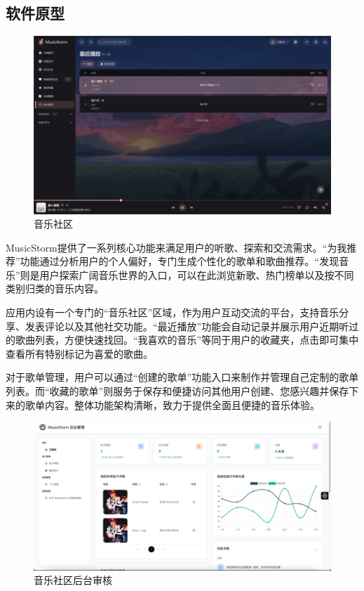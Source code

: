 \documentclass{base}
\begin{document}
\subsection{软件原型}

\begin{figure}[H]
    \centering
    \includegraphics[width=\textwidth]{images/4-4-origin.png}
    \caption{音乐社区}
\end{figure}

MusicStorm提供了一系列核心功能来满足用户的听歌、探索和交流需求。“为我推荐”功能通过分析用户的个人偏好，专门生成个性化的歌单和歌曲推荐。“发现音乐”则是用户探索广阔音乐世界的入口，可以在此浏览新歌、热门榜单以及按不同类别归类的音乐内容。

应用内设有一个专门的“音乐社区”区域，作为用户互动交流的平台，支持音乐分享、发表评论以及其他社交功能。“最近播放”功能会自动记录并展示用户近期听过的歌曲列表，方便快速找回。“我喜欢的音乐”等同于用户的收藏夹，点击即可集中查看所有特别标记为喜爱的歌曲。

对于歌单管理，用户可以通过“创建的歌单”功能入口来制作并管理自己定制的歌单列表。而“收藏的歌单”则服务于保存和便捷访问其他用户创建、您感兴趣并保存下来的歌单内容。整体功能架构清晰，致力于提供全面且便捷的音乐体验。

\begin{figure}[H]
    \centering
    \includegraphics[width=\textwidth]{images/4-5.png}
    \caption{音乐社区后台审核}
\end{figure}
\end{document}
